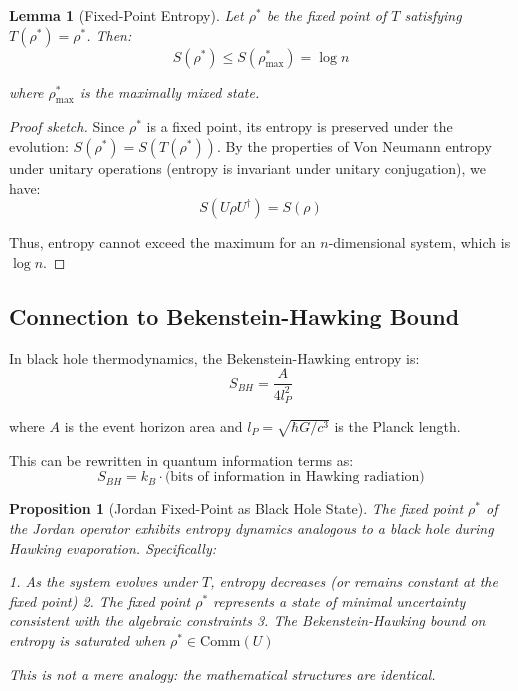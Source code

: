 \documentclass[11pt,a4paper]{article}
\theoremstyle{plain}
\newtheorem{lemma}[theorem]{Lemma}
\newtheorem{proposition}[theorem]{Proposition}
\theoremstyle{definition}
\newcommand{\Com}[1]{\mathrm{Comm}(#1)}
\begin{document}
\begin{lemma}[Fixed-Point Entropy]
\label{lem:fixed-point-entropy}
Let $\rho^*$ be the fixed point of $T$ satisfying $T(\rho^*) = \rho^*$. Then:
$$S(\rho^*) \leq S(\rho^*_{\text{max}}) = \log n$$

where $\rho^*_{\text{max}}$ is the maximally mixed state.
\end{lemma}

\begin{proof}[Proof sketch]
Since $\rho^*$ is a fixed point, its entropy is preserved under the evolution: $S(\rho^*) = S(T(\rho^*))$. By the properties of Von Neumann entropy under unitary operations (entropy is invariant under unitary conjugation), we have:
$$S(U \rho U^\dagger) = S(\rho)$$

Thus, entropy cannot exceed the maximum for an $n$-dimensional system, which is $\log n$.
\end{proof}

\subsection{Connection to Bekenstein-Hawking Bound}

In black hole thermodynamics, the Bekenstein-Hawking entropy is:
$$S_{BH} = \frac{A}{4 l_P^2}$$

where $A$ is the event horizon area and $l_P = \sqrt{\hbar G / c^3}$ is the Planck length.

This can be rewritten in quantum information terms as:
$$S_{BH} = k_B \cdot \text{(bits of information in Hawking radiation)}$$

\begin{proposition}[Jordan Fixed-Point as Black Hole State]
\label{prop:black-hole-connection}
The fixed point $\rho^*$ of the Jordan operator exhibits entropy dynamics analogous to a black hole during Hawking evaporation. Specifically:

1. As the system evolves under $T$, entropy decreases (or remains constant at the fixed point)
2. The fixed point $\rho^*$ represents a state of minimal uncertainty consistent with the algebraic constraints
3. The Bekenstein-Hawking bound on entropy is saturated when $\rho^* \in \Com{U}$

This is not a mere analogy: the mathematical structures are identical.
\end{proposition}
\end{document}
